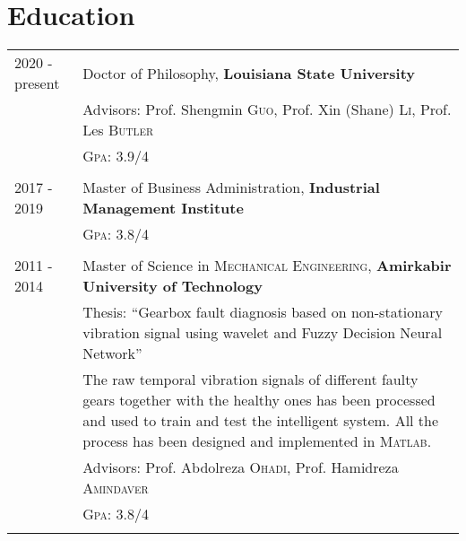 \documentclass[a4paper,9pt]{article}
\begin{document}


\section{Education}
\begin{tabular}{p{1.7cm}|p{13.3cm}}	

2020 - present & Doctor of Philosophy, \textbf{Louisiana State University}\\
&\small Advisors: Prof. Shengmin \textsc{Guo}, Prof. Xin (Shane) \textsc{Li}, Prof. Les \textsc{Butler}\\
&\normalsize \textsc{Gpa}: 3.9/4\\\multicolumn{2}{c}{}\\

2017 - 2019 & Master of Business Administration, \textbf{Industrial Management Institute}\\
&\normalsize \textsc{Gpa}: 3.8/4\\\multicolumn{2}{c}{}\\

 2011 - 2014 & Master of Science in \textsc{Mechanical Engineering}, \textbf{Amirkabir University of Technology}\\
& Thesis: ``Gearbox fault diagnosis based on non-stationary vibration signal using wavelet and Fuzzy Decision Neural Network'' \\
& \footnotesize{The raw temporal vibration signals of different faulty gears together with the healthy ones has been processed and used to train and test the intelligent system. All the process has been designed and implemented in \textsc{Matlab}}.\\
&\small Advisors: Prof. Abdolreza \textsc{Ohadi}, Prof. Hamidreza \textsc{Amindaver}\\
&\normalsize \textsc{Gpa}: 3.8/4\\\multicolumn{2}{c}{}\\


\end{tabular}
\end{document}
